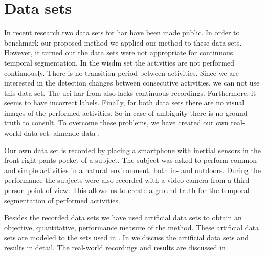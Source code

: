\section{Data sets}\label{sec:intro_data_sets}
In recent research two data sets for \gls{har} have been made public.
In order to benchmark our proposed method we applied our method to these data sets.
However, it turned out the data sets were not appropriate for continuous temporal segmentation.
In the \gls{wisdm} set \cite{kwapisz2011activity} the activities are not performed continuously.
There is no transition period between activities.
Since we are interested in the detection changes between consecutive activities, we can not use this data set.
The \gls{uci-har} from \cite{anguita2012human} also lacks continuous recordings.
Furthermore, it seems to have incorrect labels.
Finally, for both data sets there are no visual images of the performed activities.
So in case of ambiguity there is no ground truth to consult.
To overcome these problems, we have created our own real-world data set: \acrlong{almende-data} \cite{vlasveld2014acras}.

Our own data set is recorded by placing a smartphone with inertial sensors in the front right pants pocket of a subject.
The subject was asked to perform common and simple activities in a natural environment, both in- and outdoors.
During the performance the subjects were also recorded with a video camera from a third-person point of view.
This allows us to create a ground truth for the temporal segmentation of performed activities.

Besides the recorded data sets we have used artificial data sets to obtain an objective, quantitative, performance measure of the method.
These artificial data sets are modeled to the sets used in \cite{camci2010change,takeuchi2006unifying}.
In  we discuss the artificial data sets and results in detail.
The real-world recordings and results are discussed in .

